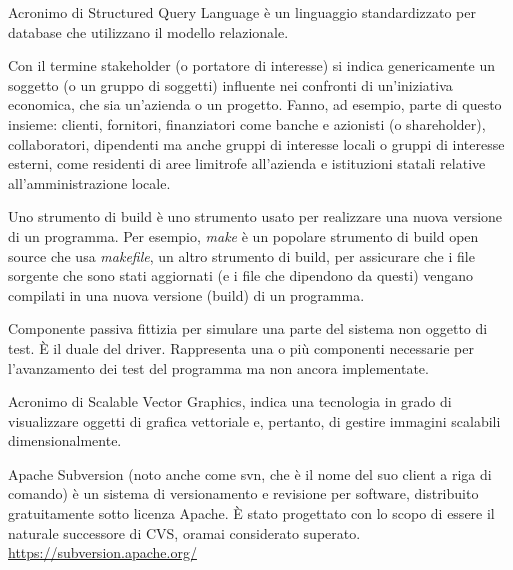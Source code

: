 Acronimo di Structured Query Language è un linguaggio standardizzato per database che utilizzano il modello relazionale.

Con il termine stakeholder (o portatore di interesse) si indica genericamente un soggetto (o un gruppo di soggetti) influente nei confronti di un'iniziativa economica, che sia un'azienda o un progetto.
Fanno, ad esempio, parte di questo insieme: clienti, fornitori, finanziatori come banche e azionisti (o shareholder), collaboratori, dipendenti ma anche gruppi di interesse locali o gruppi di interesse esterni, come residenti di aree limitrofe all'azienda e istituzioni statali relative all'amministrazione locale.

Uno strumento di build è uno strumento usato per realizzare una nuova versione di un programma. Per esempio, \textit{make} è un popolare strumento di build open source che usa \textit{makefile}, un altro strumento di build, per assicurare che i file sorgente che sono stati aggiornati (e i file che dipendono da questi) vengano compilati in una nuova versione (build) di un programma.

Componente passiva fittizia per simulare una parte del sistema non oggetto di test. \`{E} il duale del driver. Rappresenta una o più componenti necessarie per l’avanzamento dei test del programma ma non ancora implementate.

Acronimo di Scalable Vector Graphics, indica una tecnologia in grado di visualizzare oggetti di grafica vettoriale e, pertanto, di gestire immagini scalabili dimensionalmente.

Apache Subversion (noto anche come svn, che è il nome del suo client a riga di comando) è un sistema di versionamento e revisione per software, distribuito gratuitamente sotto licenza Apache. \`{E} stato progettato con lo scopo di essere il naturale successore di CVS, oramai considerato superato.\\
\url{https://subversion.apache.org/}
\clearpage
